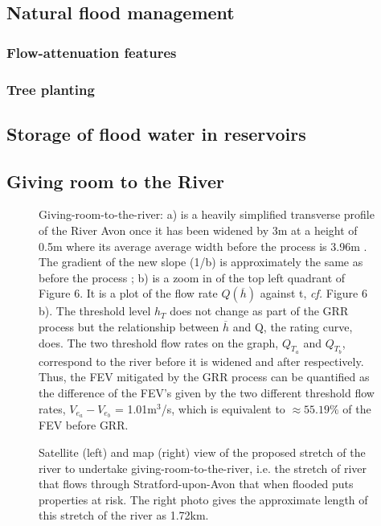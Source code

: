 \documentclass[11pt,a4paper]{article}
\begin{document}
\subsection{Natural flood management}

\subsubsection{Flow-attenuation features}

\subsubsection{Tree planting}

\subsection{Storage of flood water in reservoirs}

\subsection{Giving room to the River}

\begin{figure}[H]
\begin{center}
\hfill
{}
\caption{Giving-room-to-the-river: a) is a heavily simplified transverse profile of the River Avon once it has been widened by 3m at a height of 0.5m where its average average width before the process is 3.96m \cite{canal}. The gradient of the new slope (1/b) is approximately the same as before the process {;} b) is a zoom in of the top left quadrant of Figure 6. It is a plot of the flow rate $Q(\overline{h})$ against t, \textit{cf.} Figure 6 b). The threshold level $h_T$ does not change as part of the GRR process but the relationship between $\overline{h}$ and Q, the rating curve, does. The two threshold flow rates on the graph, $Q_{T_a}$ and $Q_{T_b}$, correspond to the river before it is widened and after respectively. Thus, the FEV mitigated by the GRR process can be quantified as the difference of the FEV's given by the two different threshold flow rates, $V_{e_a}-V_{e_b}$ = 1.01m$^3$/s, which is equivalent to $\approx 55.19\%$ of the FEV before GRR.}
\end{center}
\end{figure}

\begin{figure}[H]
\caption{Satellite (left) and map (right) view \cite{maps} of the proposed stretch of the river to undertake giving-room-to-the-river, i.e. the stretch of river that flows through Stratford-upon-Avon that when flooded puts properties at risk. The right photo gives the approximate length of this stretch of the river as 1.72km.}
\end{figure}
\end{document}
